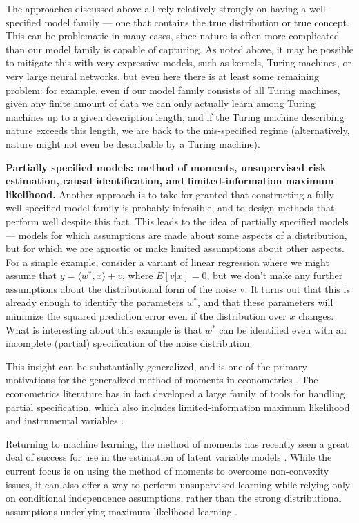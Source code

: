 \documentclass[a4paper,10pt]{article}
\begin{document}
The approaches discussed above all rely relatively strongly on having a well-specified model family --- one that contains the true distribution or true concept. This can be problematic in many cases, since nature is often more complicated than our model family is capable of capturing. As noted above, it may be possible to mitigate this with very expressive models, such as kernels, Turing machines, or very large neural networks, but even here there is at least some remaining problem: for example, even if our model family consists of all Turing machines, given any finite amount of data we can only actually learn among Turing machines up to a given description length, and if the Turing machine describing nature exceeds this length, we are back to the mis-specified regime (alternatively, nature might not even be describable by a Turing machine).

{\bf Partially specified models: method of moments, unsupervised risk estimation, causal identification, and limited-information maximum likelihood.} Another approach is to take for granted that constructing a fully well-specified model family is probably infeasible, and to design methods that perform well despite this fact. This leads to the idea of partially specified models --- models for which assumptions are made about some aspects of a distribution, but for which we are agnostic or make limited assumptions about other aspects. For a simple example, consider a variant of linear regression where we might assume that $y = \langle w^*,x \rangle + v$, where $E[v | x] = 0$, but we don’t make any further assumptions about the distributional form of the noise v. It turns out that this is already enough to identify the parameters $w^*$, and that these parameters will minimize the squared prediction error even if the distribution over $x$ changes. What is interesting about this example is that $w^*$ can be identified even with an incomplete (partial) specification of the noise distribution.

This insight can be substantially generalized, and is one of the primary motivations for the generalized method of moments in econometrics \cite{hansen1982large,powell1994networks,hansen2014nobel}. The econometrics literature has in fact developed a large family of tools for handling partial specification, which also includes limited-information maximum likelihood and instrumental variables \cite{anderson1949estimation,anderson1950asymptotic,sargan1958estimation,sargan1959estimation}.

Returning to machine learning, the method of moments has recently seen a great deal of success for use in the estimation of latent variable models \cite{anandkumar2012method}. While the current focus is on using the method of moments to overcome non-convexity issues, it can also offer a way to perform unsupervised learning while relying only on conditional independence assumptions, rather than the strong distributional assumptions underlying maximum likelihood learning \cite{steinhardt2016unsupervised}.
\end{document}
